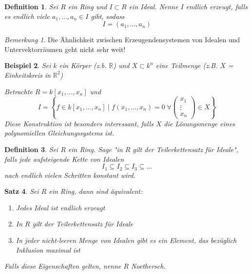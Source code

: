 \documentclass[a4paper,12pt,numbers=noenddot,parskip=full]{scrartcl}
\newcommand{\setR}{\mathbb{R}}
\theoremstyle{dotless}
\newtheorem{theorem}{Satz}[section]
\newtheorem{definition}[theorem]{Definition}
\newtheorem{example}[theorem]{Beispiel}
\theoremstyle{remark}
\newtheorem*{remark}{Bemerkung}
\begin{document}
	\begin{definition}
		Sei $R$ ein Ring und $I \subset R$ ein Ideal. Nenne $I$ endlich erzeugt, falls es endlich viele $a_1, \dots, a_n \in I$ gibt, sodass
		\begin{equation*}
			I = (a_1, \dots, a_n)
		\end{equation*}
	\end{definition}

	\begin{remark}
		Die Ähnlichkeit zwischen Erzeugendensystemen von Idealen und Untervektorräumen geht nicht sehr weit!
	\end{remark}

	\begin{example}
		Sei $k$ ein Körper (z.b. $\setR$) und $X \subset k^n$ eine Teilmenge (z.B. $X$ = Einheitskreis in $\setR^2$)
		
		Betrachte $R = k[x_1, \dots, x_n]$ und
		\begin{equation*}
			I = \left\{ f \in k[x_1, \dots, x_n] \mid f(x_1, \dots, x_n) = 0 \;\forall \begin{pmatrix}
				x_1 \\ \vdots \\ x_n
			\end{pmatrix} \in X \right\}
		\end{equation*}
		Diese Konstruktion ist besonders interessant, falls $X$ die Lösungsmenge eines polynomiellen Gleichungssystems ist.
	\end{example}

	\begin{definition}
		Sei $R$ ein Ring. Sage "in $R$ gilt der Teilerkettensatz für Ideale", falls jede aufsteigende Kette von Idealen
		\begin{equation*}
			I_1 \subseteq I_2 \subseteq I_3 \subseteq \dots
		\end{equation*}
		nach endlich vielen Schritten konstant wird.
	\end{definition}

	\begin{theorem}
		Sei $R$ ein Ring, dann sind äquivalent:
		\begin{enumerate}
			\item Jedes Ideal ist endlich erzeugt
			\item In $R$ gilt der Teilerkettensatz für Ideale
			\item In jeder nicht-leeren Menge von Idealen gibt es ein Element, das bezüglich Inklusion maximal ist
		\end{enumerate}
		Falls diese Eigenschaften gelten, nenne $R$ Noethersch.
	\end{theorem}
\end{document}
